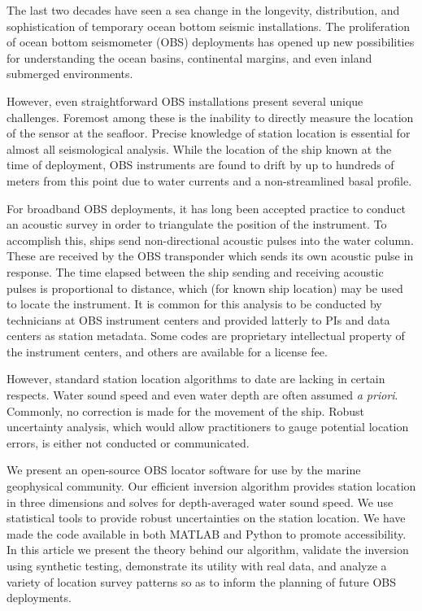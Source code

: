 The last two decades have seen a sea change in the longevity, distribution, and sophistication of temporary ocean bottom seismic installations. The proliferation of ocean bottom seismometer (OBS) deployments has opened up new possibilities for understanding the ocean basins, continental margins, and even inland submerged environments. 

However, even straightforward OBS installations present several unique challenges. Foremost among these is the inability to directly measure the location of the sensor at the seafloor. Precise knowledge of station location is essential for almost all seismological analysis. While the location of the ship known at the time of deployment, OBS instruments are found to drift by up to hundreds of meters from this point due to water currents and a non-streamlined  basal profile. 

For broadband OBS deployments, it has long been accepted practice to conduct an acoustic survey in order to triangulate the position of the instrument. To accomplish this, ships send non-directional acoustic pulses into the water column. These are received by the OBS transponder which sends its own acoustic pulse in response. The time elapsed between the ship sending and receiving acoustic pulses is proportional to distance, which (for known ship location) may be used to locate the instrument. It is common for this analysis to be conducted by technicians at OBS instrument centers and provided latterly to PIs and data centers as station metadata. Some codes are proprietary intellectual property of the instrument centers, and others are available for a license fee. 

However, standard station location algorithms to date are lacking in certain respects. Water sound speed and even water depth are often assumed \textit{a priori}. Commonly, no correction is made for the movement of the ship. Robust uncertainty analysis, which would allow practitioners to gauge potential location errors, is either not conducted or communicated. 

We present an open-source OBS locator software for use by the marine geophysical community. Our efficient inversion algorithm provides station location in three dimensions and solves for depth-averaged water sound speed. We use statistical tools to provide robust uncertainties on the station location. We have made the code available in both MATLAB and Python to promote accessibility. In this article we present the theory behind our algorithm, validate the inversion using synthetic testing, demonstrate its utility with real data, and analyze a variety of location survey patterns so as to inform the planning of future OBS deployments. 